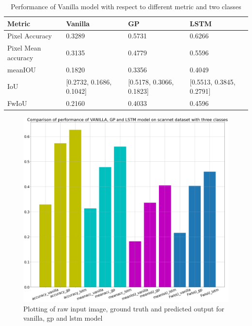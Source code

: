 	\begin{table}[h]
		\begin{center}
			\begin{tabular}{ | l | l | l | p{4cm} |}
				\hline
				
				\cellcolor{purple!30}Metric & \cellcolor{purple!30}Vanilla & \cellcolor{purple!30}GP & \cellcolor{purple!30}LSTM\\ \hline
				Pixel Accuracy & 0.3289 & 0.5731 & 0.6266 \\ \hline
				Pixel Mean accuracy & 0.3135 & 0.4779 & 0.5596 \\ \hline
				meanIOU & 0.1820 & 0.3356 & 0.4049 \\ \hline
				IoU & [0.2732, 0.1686, 0.1042] & [0.5178, 0.3066, 0.1823] & [0.5513, 0.3845, 0.2791] \\ \hline
				FwIoU & 0.2160 & 0.4033 & 0.4596 \\ \hline
				\hline
			\end{tabular}
			\caption{Performance of Vanilla model with respect to different metric and two classes}
			\label{table:unet_scannet_three_classes}
		\end{center}
	\end{table}	
	
	\begin{figure}
		\centering
		\includegraphics[width=12cm]{images/scannet_performance_three_classes.png}
		\caption{Plotting of raw input image, ground truth and predicted output for vanilla, gp and lstm model}
		\label{fig:performance_metric_three_classes_unet}
	\end{figure}

